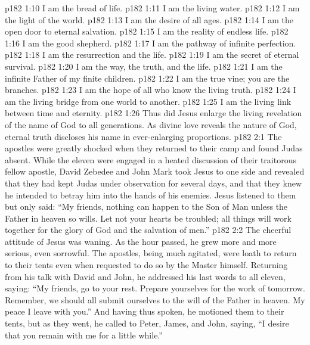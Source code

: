 \pc \vs p182 1:10 \textcolor{ubdarkred}{I am the bread of life.}
\vs p182 1:11 \textcolor{ubdarkred}{I am the living water.}
\vs p182 1:12 \textcolor{ubdarkred}{I am the light of the world.}
\vs p182 1:13 \textcolor{ubdarkred}{I am the desire of all ages.}
\vs p182 1:14 \textcolor{ubdarkred}{I am the open door to eternal salvation.}
\vs p182 1:15 \textcolor{ubdarkred}{I am the reality of endless life.}
\vs p182 1:16 \textcolor{ubdarkred}{I am the good shepherd.}
\vs p182 1:17 \textcolor{ubdarkred}{I am the pathway of infinite perfection.}
\vs p182 1:18 \textcolor{ubdarkred}{I am the resurrection and the life.}
\vs p182 1:19 \textcolor{ubdarkred}{I am the secret of eternal survival.}
\vs p182 1:20 \textcolor{ubdarkred}{I am the way, the truth, and the life.}
\vs p182 1:21 \textcolor{ubdarkred}{I am the infinite Father of my finite children.}
\vs p182 1:22 \textcolor{ubdarkred}{I am the true vine; you are the branches.}
\vs p182 1:23 \textcolor{ubdarkred}{I am the hope of all who know the living truth.}
\vs p182 1:24 \textcolor{ubdarkred}{I am the living bridge from one world to another.}
\vs p182 1:25 \textcolor{ubdarkred}{I am the living link between time and eternity.}
\pc \vs p182 1:26 Thus did Jesus enlarge the living revelation of the name of God to all generations. As divine love reveals the nature of God, eternal truth discloses his name in ever\hyp{}enlarging proportions.
\vs p182 2:1 The apostles were greatly shocked when they returned to their camp and found Judas absent. While the eleven were engaged in a heated discussion of their traitorous fellow apostle, David Zebedee and John Mark took Jesus to one side and revealed that they had kept Judas under observation for several days, and that they knew he intended to betray him into the hands of his enemies. Jesus listened to them but only said: \textcolor{ubdarkred}{“My friends, nothing can happen to the Son of Man unless the Father in heaven so wills. Let not your hearts be troubled; all things will work together for the glory of God and the salvation of men.”}
\vs p182 2:2 The cheerful attitude of Jesus was waning. As the hour passed, he grew more and more serious, even sorrowful. The apostles, being much agitated, were loath to return to their tents even when requested to do so by the Master himself. Returning from his talk with David and John, he addressed his last words to all eleven, saying: \textcolor{ubdarkred}{“My friends, go to your rest. Prepare yourselves for the work of tomorrow. Remember, we should all submit ourselves to the will of the Father in heaven. My peace I leave with you.”} And having thus spoken, he motioned them to their tents, but as they went, he called to Peter, James, and John, saying, \textcolor{ubdarkred}{“I desire that you remain with me for a little while.”}
